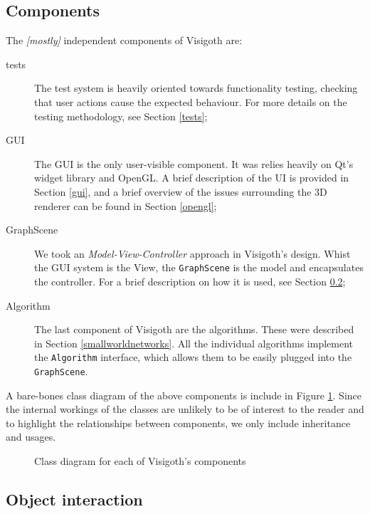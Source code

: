 \documentclass[a4paper,11pt,titlepage]{article}
\newcommand{\code}[1]{\texttt{#1}}
\newcommand{\buzz}[1]{\emph{#1}}
\begin{document}
\subsection{Components}
\label{components}

The \emph{[mostly]} independent components of Visigoth are:
\begin{description}
  \item [tests] The test system is heavily oriented towards
    functionality testing, checking that user actions cause the
    expected behaviour. For more details on the testing methodology,
    see Section \ref{tests};

  \item [GUI] The GUI is the only user-visible component. It was
    relies heavily on Qt's widget library and OpenGL. A brief
    description of the UI is provided in Section \ref{gui}, and a
    brief overview of the issues surrounding the 3D renderer can be
    found in Section \ref{opengl};

  \item [GraphScene] We took an \buzz{Model-View-Controller} approach
    in Visigoth's design. Whist the GUI system is the View, the
    \code{GraphScene} is the model and encapsulates the
    controller. For a brief description on how it is used, see Section
    \ref{interaction};

  \item [Algorithm] The last component of Visigoth are the
    algorithms. These were described in Section
    \ref{smallworldnetworks}. All the individual algorithms implement
    the \code{Algorithm} interface, which allows them to be easily
    plugged into the \code{GraphScene}.
\end{description}

A bare-bones class diagram of the above components is include in
Figure \ref{fig:classes}. Since the internal workings of the classes
are unlikely to be of interest to the reader and to highlight the
relationships between components, we only include inheritance and
usages.

\begin{figure}[ht]
  \centering
  
  \caption{Class diagram for each of Visigoth's components}
  \label{fig:classes}
\end{figure}

\subsection{Object interaction}
\label{interaction}
\end{document}
